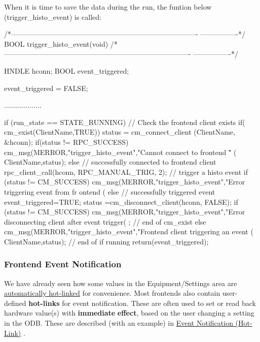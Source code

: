 When it is time to save the data during the run, the funtion below (trigger\_\-histo\_\-event) is called:


\begin{DoxyCode}
/*-------------------------------------------------------------------------------
      ----------------*/
BOOL trigger_histo_event(void)
/*-------------------------------------------------------------------------------
      ----------------*/
{
  HNDLE hconn;
  BOOL event_triggered;

  event_triggered = FALSE;

  ...................

  if (run_state == STATE_RUNNING)
    {
     // Check the frontend client exists
     if( cm_exist(ClientName,TRUE))      
        { 
          status = cm_connect_client (ClientName, &hconn);
          if(status != RPC_SUCCESS)
            cm_msg(MERROR,"trigger_histo_event","Cannot connect to frontend \"%
      " (%
                   ClientName,status);
      else      
         {  // successfully connected to frontend client
            rpc_client_call(hconn, RPC_MANUAL_TRIG, 2); // trigger a histo event
            if (status != CM_SUCCESS)
              cm_msg(MERROR,"trigger_histo_event","Error triggering event from fr
      ontend (%
            else
              {  // successfully triggered event
                event_triggered=TRUE;
                status =cm_disconnect_client(hconn, FALSE);
                if (status != CM_SUCCESS)
                  cm_msg(MERROR,"trigger_histo_event","Error disconnecting client
       after event trigger(%
;
              }
          }
       } // end of cm_exist
      else
        cm_msg(MERROR,"trigger_histo_event","Frontend client %
      triggering an event (%
               ClientName,status);
    } // end of if running
  return(event_triggered);
}
\end{DoxyCode}
 \par
 \par
  \par
 \label{index_end}
\hypertarget{index_end}{}
 \subsubsection{Frontend Event Notification}\label{FE_event_notification}
\par
 

We have already seen how some values in the Equipment/Settings area are \hyperlink{FE_ODB_equipment_tree_FE_equipment_odb_hot_links}{automatically hot-\/linked} for convenience. Most frontends also contain user-\/defined {\bfseries hot-\/links} for event notification. These are often used to set or read back hardware value(s) with {\bfseries immediate} {\bfseries effect}, based on the user changing a setting in the ODB. These are described (with an example) in \hyperlink{RC_Hot_Link}{Event Notification (Hot-\/Link)} .


